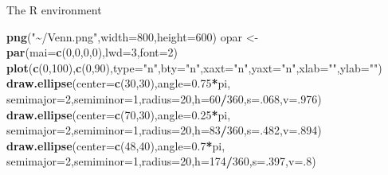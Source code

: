 \documentclass[
  ignorenonframetext,
]{beamer}
\newenvironment{Shaded}{\begin{snugshade}}{\end{snugshade}}
\newcommand{\DataTypeTok}[1]{\textcolor[rgb]{0.13,0.29,0.53}{#1}}
\newcommand{\DecValTok}[1]{\textcolor[rgb]{0.00,0.00,0.81}{#1}}
\newcommand{\FloatTok}[1]{\textcolor[rgb]{0.00,0.00,0.81}{#1}}
\newcommand{\KeywordTok}[1]{\textcolor[rgb]{0.13,0.29,0.53}{\textbf{#1}}}
\newcommand{\NormalTok}[1]{#1}
\newcommand{\OperatorTok}[1]{\textcolor[rgb]{0.81,0.36,0.00}{\textbf{#1}}}
\newcommand{\StringTok}[1]{\textcolor[rgb]{0.31,0.60,0.02}{#1}}
\begin{document}
\begin{frame}[fragile]{The R environment}
\begin{Shaded}
\begin{Highlighting}[]
\KeywordTok{png}\NormalTok{(}\StringTok{"\textasciitilde{}/Venn.png"}\NormalTok{,}\DataTypeTok{width=}\DecValTok{800}\NormalTok{,}\DataTypeTok{height=}\DecValTok{600}\NormalTok{)}
\NormalTok{    opar \textless{}{-}}\StringTok{ }\KeywordTok{par}\NormalTok{(}\DataTypeTok{mai=}\KeywordTok{c}\NormalTok{(}\DecValTok{0}\NormalTok{,}\DecValTok{0}\NormalTok{,}\DecValTok{0}\NormalTok{,}\DecValTok{0}\NormalTok{),}\DataTypeTok{lwd=}\DecValTok{3}\NormalTok{,}\DataTypeTok{font=}\DecValTok{2}\NormalTok{)}
        \KeywordTok{plot}\NormalTok{(}\KeywordTok{c}\NormalTok{(}\DecValTok{0}\NormalTok{,}\DecValTok{100}\NormalTok{),}\KeywordTok{c}\NormalTok{(}\DecValTok{0}\NormalTok{,}\DecValTok{90}\NormalTok{),}\DataTypeTok{type=}\StringTok{"n"}\NormalTok{,}\DataTypeTok{bty=}\StringTok{"n"}\NormalTok{,}\DataTypeTok{xaxt=}\StringTok{"n"}\NormalTok{,}\DataTypeTok{yaxt=}\StringTok{"n"}\NormalTok{,}\DataTypeTok{xlab=}\StringTok{""}\NormalTok{,}\DataTypeTok{ylab=}\StringTok{""}\NormalTok{)}
        \KeywordTok{draw.ellipse}\NormalTok{(}\DataTypeTok{center=}\KeywordTok{c}\NormalTok{(}\DecValTok{30}\NormalTok{,}\DecValTok{30}\NormalTok{),}\DataTypeTok{angle=}\FloatTok{0.75}\OperatorTok{*}\NormalTok{pi,}
                     \DataTypeTok{semimajor=}\DecValTok{2}\NormalTok{,}\DataTypeTok{semiminor=}\DecValTok{1}\NormalTok{,}\DataTypeTok{radius=}\DecValTok{20}\NormalTok{,}\DataTypeTok{h=}\DecValTok{60}\OperatorTok{/}\DecValTok{360}\NormalTok{,}\DataTypeTok{s=}\NormalTok{.}\DecValTok{068}\NormalTok{,}\DataTypeTok{v=}\NormalTok{.}\DecValTok{976}\NormalTok{)}
        \KeywordTok{draw.ellipse}\NormalTok{(}\DataTypeTok{center=}\KeywordTok{c}\NormalTok{(}\DecValTok{70}\NormalTok{,}\DecValTok{30}\NormalTok{),}\DataTypeTok{angle=}\FloatTok{0.25}\OperatorTok{*}\NormalTok{pi,}
                     \DataTypeTok{semimajor=}\DecValTok{2}\NormalTok{,}\DataTypeTok{semiminor=}\DecValTok{1}\NormalTok{,}\DataTypeTok{radius=}\DecValTok{20}\NormalTok{,}\DataTypeTok{h=}\DecValTok{83}\OperatorTok{/}\DecValTok{360}\NormalTok{,}\DataTypeTok{s=}\NormalTok{.}\DecValTok{482}\NormalTok{,}\DataTypeTok{v=}\NormalTok{.}\DecValTok{894}\NormalTok{)}
        \KeywordTok{draw.ellipse}\NormalTok{(}\DataTypeTok{center=}\KeywordTok{c}\NormalTok{(}\DecValTok{48}\NormalTok{,}\DecValTok{40}\NormalTok{),}\DataTypeTok{angle=}\FloatTok{0.7}\OperatorTok{*}\NormalTok{pi,}
                     \DataTypeTok{semimajor=}\DecValTok{2}\NormalTok{,}\DataTypeTok{semiminor=}\DecValTok{1}\NormalTok{,}\DataTypeTok{radius=}\DecValTok{20}\NormalTok{,}\DataTypeTok{h=}\DecValTok{174}\OperatorTok{/}\DecValTok{360}\NormalTok{,}\DataTypeTok{s=}\NormalTok{.}\DecValTok{397}\NormalTok{,}\DataTypeTok{v=}\NormalTok{.}\DecValTok{8}\NormalTok{)}

\end{Highlighting}
\end{Shaded}
\end{frame}
\end{document}
